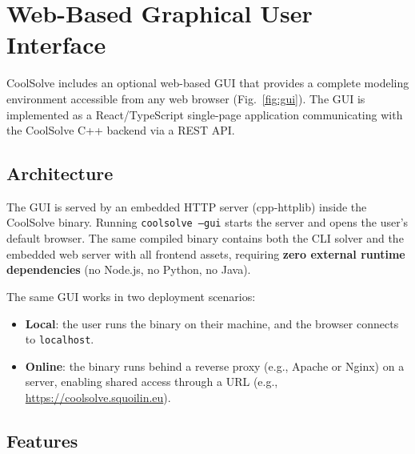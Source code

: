 \documentclass[review,3p]{elsarticle}
\begin{document}
\section{Web-Based Graphical User Interface}
\label{sec:gui}

CoolSolve includes an optional web-based GUI that provides a complete modeling environment accessible from any web browser (Fig.~\ref{fig:gui}). The GUI is implemented as a React/TypeScript single-page application communicating with the CoolSolve C++ backend via a REST API.

\subsection{Architecture}

The GUI is served by an embedded HTTP server (cpp-httplib) inside the CoolSolve binary. Running \texttt{coolsolve --gui} starts the server and opens the user's default browser. The same compiled binary contains both the CLI solver and the embedded web server with all frontend assets, requiring \textbf{zero external runtime dependencies} (no Node.js, no Python, no Java).

The same GUI works in two deployment scenarios:
\begin{itemize}
    \item \textbf{Local}: the user runs the binary on their machine, and the browser connects to \texttt{localhost}.
    \item \textbf{Online}: the binary runs behind a reverse proxy (e.g., Apache or Nginx) on a server, enabling shared access through a URL (e.g., \url{https://coolsolve.squoilin.eu}).
\end{itemize}

\subsection{Features}
\end{document}

